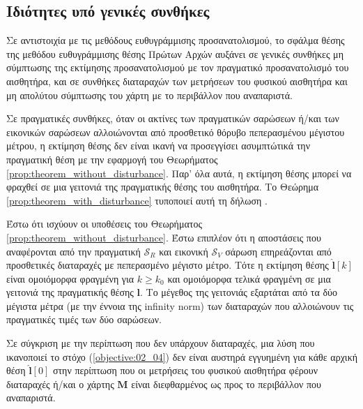 \subsection{Ιδιότητες υπό γενικές συνθήκες}
\label{subsection:02_04_03:02}

Σε αντιστοιχία με τις μεθόδους ευθυγράμμισης προσανατολισμού, το σφάλμα θέσης
της μεθόδου ευθυγράμμισης θέσης Πρώτων Αρχών αυξάνει σε γενικές συνθήκες μη
σύμπτωσης της εκτίμησης προσανατολισμού με τον πραγματικό προσανατολισμό του
αισθητήρα, και σε συνθήκες διαταραχών των μετρήσεων του φυσικού αισθητήρα και
μη απολύτου σύμπτωσης του χάρτη με το περιβάλλον που αναπαριστά.

Σε πραγματικές συνθήκες, όταν οι ακτίνες των πραγματικών σαρώσεων ή/και των
εικονικών σαρώσεων αλλοιώνονται από προσθετικό θόρυβο πεπερασμένου μέγιστου
μέτρου, η εκτίμηση θέσης δεν είναι ικανή να προσεγγίσει ασυμπτώτικά την
πραγματική θέση με την εφαρμογή του Θεωρήματος
\ref{prop:theorem_without_disturbance}. Παρ' όλα αυτά, η εκτίμηση θέσης μπορεί
να φραχθεί σε μια γειτονιά της πραγματικής θέσης του αισθητήρα. Το Θεώρημα
\ref{prop:theorem_with_disturbance} τυποποιεί αυτή τη δήλωση
\cite{Filotheou2022d}.

\begin{bw_box}
\begin{theorem}
  \label{prop:theorem_with_disturbance}
  Έστω ότι ισχύουν οι υποθέσεις του Θεωρήματος
  \ref{prop:theorem_without_disturbance}. Έστω επιπλέον ότι η αποστάσεις που
  αναφέρονται από την πραγματική $\mathcal{S}_R$ και εικονική $\mathcal{S}_V$
  σάρωση επηρεάζονται από προσθετικές διαταραχές με πεπερασμένο μέγιστο μέτρο.
  Τότε η εκτίμηση θέσης $\hat{\bm{l}}[k]$ είναι ομοιόμορφα φραγμένη για $k \geq
  k_0$ και ομοιόμορφα τελικά φραγμένη σε μια γειτονιά της πραγματικής θέσης
  $\bm{l}$. Το μέγεθος της γειτονιάς εξαρτάται από τα δύο μέγιστα μέτρα
  (με την έννοια της infinity norm) των διαταραχών που αλλοιώνουν τις
  πραγματικές τιμές των δύο σαρώσεων.
\end{theorem}
\end{bw_box}

\begin{corollary}
  Σε σύγκριση με την περίπτωση που δεν υπάρχουν διαταραχές, μια λύση που
  ικανοποιεί το στόχο (\ref{objective:02_04}) δεν είναι αυστηρά εγγυημένη για
  κάθε αρχική θέση $\hat{\bm{l}}[0]$ στην περίπτωση που οι μετρήσεις του φυσικού
  αισθητήρα φέρουν διαταραχές ή/και ο χάρτης $\bm{M}$ είναι διεφθαρμένος ως προς
  το περιβάλλον που αναπαριστά.
\end{corollary}

